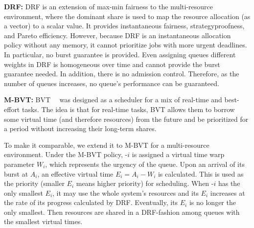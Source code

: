 %

\textbf{DRF:}  
DRF is an extension of max-min fairness to the multi-resource environment, where the dominant share is used to map the resource allocation (as a vector) to a scalar value. 
It provides instantaneous fairness, strategyproofness, and Pareto efficiency. %
However, because DRF is an instantaneous allocation policy without any memory, it cannot prioritize jobs with more urgent deadlines. In particular, no burst guarantee is provided. %
Even assigning queues different weights in DRF is homogeneous over time and cannot provide the burst guarantee needed. In addition, there is no admission control. Therefore, as the number of queues increases, no queue's performance can be guaranteed.

\textbf{M-BVT: }
BVT~~\cite{bvt} was designed as a scheduler for a mix of real-time and best-effort tasks. The idea is that for real-time tasks, BVT allows them to borrow some virtual time (and therefore resources) from the future and be prioritized for a period without increasing their long-term shares. 

To make it comparable, we extend it to M-BVT for a multi-resource environment.
Under the M-BVT policy, \burstq-$i$ is assigned a virtual time warp parameter $W_i$, which represents the urgency of the queue. Upon an arrival of its burst at $A_i$, an effective virtual time $E_i = A_i-W_i$ is calculated. This is used as the priority (smaller $E_i$ means higher priority) for scheduling. When \burstq-$i$ has the only smallest $E_i$, it may use the whole system's resources and its $E_i$ increases at the rate of its progress calculated by DRF. Eventually, its $E_i$ is no longer the only smallest. Then resources are shared in a DRF-fashion among queues with the smallest virtual times.



